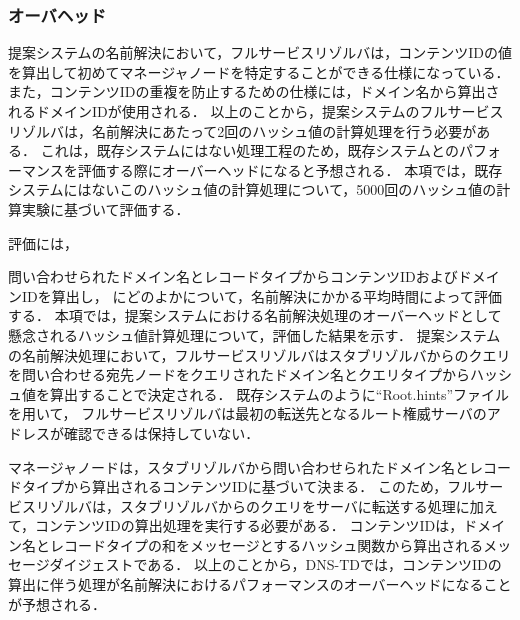 \newpage
\subsubsection{オーバヘッド}
提案システムの名前解決において，フルサービスリゾルバは，コンテンツIDの値を算出して初めてマネージャノードを特定することができる仕様になっている．
また，コンテンツIDの重複を防止するための仕様には，ドメイン名から算出されるドメインIDが使用される．
以上のことから，提案システムのフルサービスリゾルバは，名前解決にあたって2回のハッシュ値の計算処理を行う必要がある．
これは，既存システムにはない処理工程のため，既存システムとのパフォーマンスを評価する際にオーバーヘッドになると予想される．
本項では，既存システムにはないこのハッシュ値の計算処理について，5000回のハッシュ値の計算実験に基づいて評価する．

評価には，

問い合わせられたドメイン名とレコードタイプからコンテンツIDおよびドメインIDを算出し，
にどのよかについて，名前解決にかかる平均時間によって評価する．
本項では，提案システムにおける名前解決処理のオーバーヘッドとして懸念されるハッシュ値計算処理について，評価した結果を示す．
提案システムの名前解決処理において，フルサービスリゾルバはスタブリゾルバからのクエリを問い合わせる宛先ノードをクエリされたドメイン名とクエリタイプからハッシュ値を算出することで決定される．
既存システムのように``Root.hints''ファイルを用いて，
フルサービスリゾルバは最初の転送先となるルート権威サーバのアドレスが確認できるは保持していない．

マネージャノードは，スタブリゾルバから問い合わせられたドメイン名とレコードタイプから算出されるコンテンツIDに基づいて決まる．
このため，フルサービスリゾルバは，スタブリゾルバからのクエリをサーバに転送する処理に加えて，コンテンツIDの算出処理を実行する必要がある．
コンテンツIDは，ドメイン名とレコードタイプの和をメッセージとするハッシュ関数から算出されるメッセージダイジェストである．
以上のことから，DNS-TDでは，コンテンツIDの算出に伴う処理が名前解決におけるパフォーマンスのオーバーヘッドになることが予想される．

